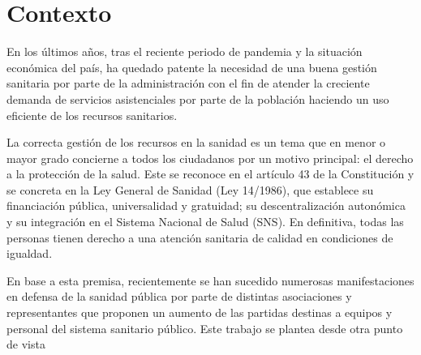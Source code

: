 \section{Contexto}

En los últimos años, tras el reciente periodo de pandemia y la situación económica del país, ha quedado patente la necesidad de una buena gestión sanitaria por parte de la administración con el fin de atender la creciente demanda de servicios asistenciales por parte de la población haciendo un uso eficiente de los recursos sanitarios.

La correcta gestión de los recursos en la sanidad es un tema que en menor o mayor grado concierne a todos los ciudadanos por un motivo principal: el derecho a la protección de la salud. Este se reconoce en el artículo 43 de la Constitución y se concreta en la Ley General de Sanidad (Ley 14/1986), que establece su financiación pública, universalidad y gratuidad; su descentralización autonómica y su integración en el Sistema Nacional de Salud (SNS). En definitiva, todas las personas tienen derecho a una atención sanitaria de calidad en condiciones de igualdad.

En base a esta premisa, recientemente se han sucedido numerosas manifestaciones en defensa de la sanidad pública por parte de distintas asociaciones y representantes que proponen un aumento de las partidas destinas a equipos y personal del sistema sanitario público. Este trabajo se plantea desde otra punto de vista


